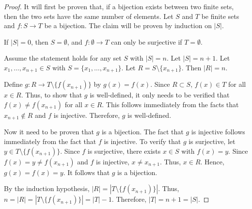 \documentclass[12pt]{article}
\begin{document}
\begin{proof}
It will first be proven that, if a bijection exists between two finite sets, then the two sets have the same number of elements.  Let $S$ and $T$ be finite sets and $f \colon S \to T$ be a bijection.  The claim will be proven by induction on $|S|$.

If $|S|=0$, then $S=\emptyset$, and $f \colon \emptyset \to T$ can only be surjective if $T=\emptyset$.

Assume the statement holds for any set $S$ with $|S|=n$.  Let $|S|=n+1$.  Let $x_1, \dots , x_{n+1} \in S$ with $S=\{x_1, \dots , x_{n+1}\}$.  Let $R=S \setminus \{x_{n+1}\}$.  Then $|R|=n$.

Define $g \colon R \to T \setminus \{f(x_{n+1})\}$ by $g(x)=f(x)$.  Since $R \subset S$, $f(x) \in T$ for all $x \in R$.  Thus, to show that $g$ is well-defined, it only needs to be verified that $f(x) \neq f(x_{n+1})$ for all $x \in R$.  This follows immediately from the facts that $x_{n+1} \notin R$ and $f$ is injective.  Therefore, $g$ is well-defined.

Now it need to be proven that $g$ is a bijection.  The fact that $g$ is injective follows immediately from the fact that $f$ is injective.  To verify that $g$ is surjective, let $y \in T \setminus \{f(x_{n+1})\}$.  Since $f$ is surjective, there exists $x \in S$ with $f(x)=y$.  Since $f(x)=y \neq f(x_{n+1})$ and $f$ is injective, $x \neq x_{n+1}$.  Thus, $x \in R$.  Hence, $g(x)=f(x)=y$.  It follows that $g$ is a bijection.

By the induction hypothesis, $|R|=|T \setminus \{f(x_{n+1})\}|$.  Thus, $n=|R|=|T \setminus \{f(x_{n+1})\}|=|T|-1$.  Therefore, $|T|=n+1=|S|$.
\end{proof}
\end{document}

